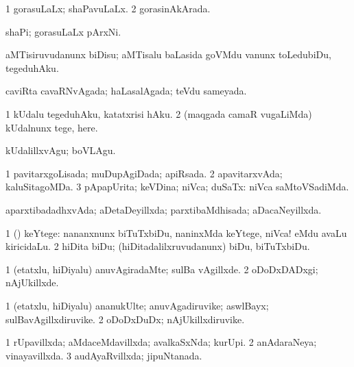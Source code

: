 {\bentry
{} 
\gl{\gu}
\expl{}
\bmng
\bnum
\num{1} gorasuLaLx; shaPavuLaLx. 
\num{2} gorasinAkArada. 
\enum
\emng
\eentry

\bentry
{} 
\gl{\nA}
\expl{}
\bmng
shaPi; gorasuLaLx pArxNi. 
\emng
\eentry

\bentry
{} 
\gl{\akirx}
\expl{}
\bmng
aMTisiruvudanunx biDisu; aMTisalu baLasida goVMdu \mo vanunx toLedubiDu, tegeduhAku. 
\emng
\eentry

\bentry
{} 
\gl{\gu}
\expl{}
\bmng
caviRta cavaRNvAgada; haLasalAgada; teVdu sameyada. 
\emng
\eentry

\bentry
{} 
\gl{\sakirx}
\expl{}
\bmng
\bnum
\num{1} kUdalu tegeduhAku, katatxrisi hAku. 
\num{2} (maqgada camaR \mo vugaLiMda) kUdalnunx tege, here. 
\enum
\emng

\noindent
\gl{\akirx}
\expl{}
\bmng
kUdalillxvAgu; boVLAgu. 
\emng
\eentry

\bentry
{} 
\gl{\gu}
\expl{}
\bmng
\bnum
\num{1} pavitarxgoLisada; muDupAgiDada; apiRsada. 
\num{2} apavitarxvAda; kaluSitagoMDa. 
\num{3} pApapUrita; keVDina; niVca; duSaTx:  niVca saMtoVSadiMda. 
\enum
\emng
\eentry

\bentry
{} 
\gl{\gu}
\expl{}
\bmng
aparxtibadadhxvAda; aDetaDeyillxda; parxtibaMdhisada; aDacaNeyillxda. 
\emng
\eentry

\bentry
{} 
\gl{\akirx}
\expl{}
\bmng
\bnum
\num{1} (\kAparx) keYtege:  nananxnunx biTuTxbiDu, naninxMda keYtege, niVca! eMdu avaLu kiricidaLu. 
\num{2} hiDita biDu; (hiDitadalilxruvudanunx) biDu, biTuTxbiDu. 
\enum
\emng
\eentry

\bentry
{} 
\gl{\kirxvi}
\expl{}
\bmng
\bnum
\num{1} (etatxlu, hiDiyalu) anuvAgiradaMte; sulBa vAgillxde. 
\num{2} oDoDxDADxgi; nAjUkillxde. 
\enum
\emng
\eentry

\bentry
{} 
\gl{\nA}
\expl{}
\bmng
\bnum
\num{1} (etatxlu, hiDiyalu) ananukUlte; anuvAgadiruvike; aswlBayx; sulBavAgillxdiruvike. 
\num{2} oDoDxDuDx; nAjUkillxdiruvike. 
\enum
\emng
\eentry

\bentry
{} 
\gl{\gu}
\expl{}
\bmng
\bnum
\num{1} rUpavillxda; aMdaceMdavillxda; avalkaSxNda; kurUpi. 
\num{2} anAdaraNeya; vinayavillxda. 
\num{3} audAyaRvillxda; jipuNtanada. 
\enum
\emng
\eentry

}

